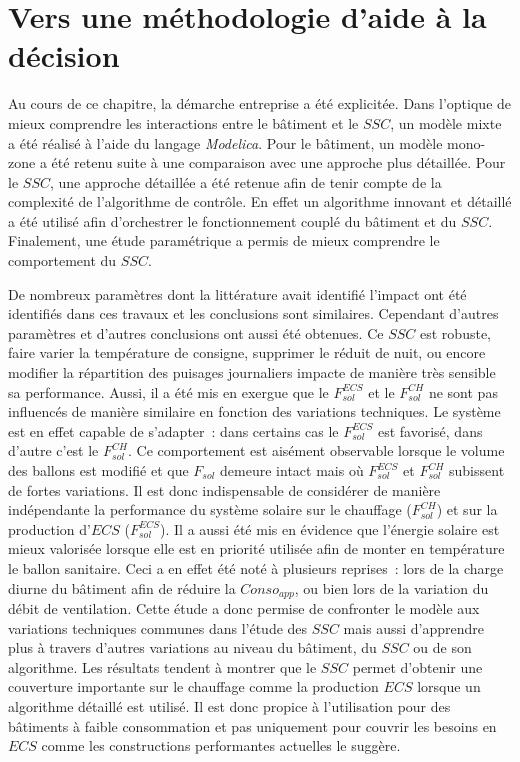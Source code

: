 \section{Vers une méthodologie d’aide à la décision} %
\label{sec:vers_une_methodologie_d_aide_a_la_decision}
Au cours de ce chapitre, la démarche entreprise a été explicitée. Dans l’optique de mieux
comprendre les interactions entre le bâtiment et le $SSC$, un modèle mixte a été réalisé à
l’aide du langage \textit{Modelica}. Pour le bâtiment, un modèle mono-zone a été retenu
suite à une comparaison avec une approche plus détaillée. Pour le $SSC$, une approche
détaillée a été retenue afin de tenir compte de la complexité de l’algorithme de contrôle.
En effet un algorithme innovant et détaillé a été utilisé afin d’orchestrer le
fonctionnement couplé du bâtiment et du $SSC$. Finalement, une étude paramétrique a permis
de mieux comprendre le comportement du $SSC$.

De nombreux paramètres dont la littérature avait identifié l’impact ont été identifiés dans
ces travaux et les conclusions sont similaires. Cependant d’autres paramètres et d’autres
conclusions ont aussi été obtenues. Ce $SSC$ est robuste, faire varier la température de
consigne, supprimer le réduit de nuit, ou encore modifier la répartition des puisages
journaliers impacte de manière très sensible sa performance. Aussi, il a été mis en exergue que
le $F_{sol}^{ECS}$ et le $F_{sol}^{CH}$ ne sont pas influencés de manière similaire en
fonction des variations techniques. Le système est en effet capable de s’adapter~: dans
certains cas le $F_{sol}^{ECS}$ est favorisé, dans d’autre c’est le $F_{sol}^{CH}$. Ce
comportement est aisément observable lorsque le volume des ballons est modifié et que
$F_{sol}$ demeure intact mais où $F_{sol}^{ECS}$ et $F_{sol}^{CH}$ subissent de fortes
variations. Il est donc indispensable de considérer de manière indépendante la performance
du système solaire sur le chauffage ($F_{sol}^{CH}$) et sur la production d’$ECS$
($F_{sol}^{ECS}$). Il a aussi été mis en évidence que l’énergie solaire est mieux
valorisée lorsque elle est en priorité utilisée afin de monter en température le ballon
sanitaire. Ceci a en effet été noté à plusieurs reprises~: lors de la charge diurne du
bâtiment afin de réduire la $Conso_{app}$, ou bien lors de la variation du débit de
ventilation. Cette étude a donc permise de confronter le modèle aux variations techniques
communes dans l’étude des $SSC$ mais aussi d’apprendre plus à travers d’autres variations
au niveau du bâtiment, du $SSC$ ou de son algorithme. Les résultats tendent à
montrer que le $SSC$ permet d’obtenir une couverture importante sur le chauffage comme la
production $ECS$ lorsque un algorithme détaillé est utilisé. Il est donc propice à
l’utilisation pour des bâtiments à faible consommation et pas uniquement pour couvrir les
besoins en $ECS$ comme les constructions performantes actuelles le suggère.

